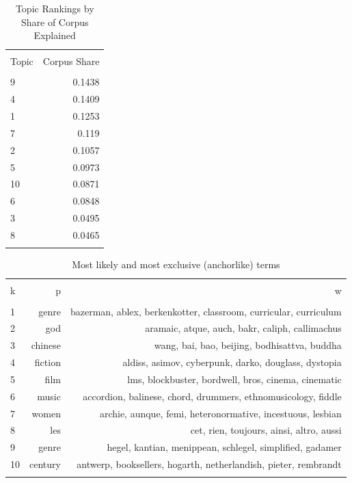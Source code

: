 \documentclass[]{book}
\theoremstyle{definition}
\theoremstyle{definition}
\theoremstyle{definition}
\theoremstyle{remark}
\begin{document}
\begin{table}[!htbp] \centering 
  \caption{Topic Rankings by Share of Corpus Explained} 
  \label{tab:topshare} 
\begin{tabular}{@{\extracolsep{5pt}} lr} 
\\[-1.8ex]\hline 
\hline \\[-1.8ex] 
Topic & Corpus Share \\ 
\hline \\[-1.8ex] 
9 & 0.1438 \\ 
4 & 0.1409 \\ 
1 & 0.1253 \\ 
7 & 0.119 \\ 
2 & 0.1057 \\ 
5 & 0.0973 \\ 
10 & 0.0871 \\ 
6 & 0.0848 \\ 
3 & 0.0495 \\ 
8 & 0.0465 \\ 
\hline \\[-1.8ex] 
\end{tabular} 
\end{table}

\begin{table}[!htbp] \centering 
  \caption{Most likely and most exclusive (anchorlike) terms} 
  \label{tab:prob-anc} 
\begin{tabular}{@{\extracolsep{5pt}} lrr} 
\\[-1.8ex]\hline 
\hline \\[-1.8ex] 
k & p & w \\ 
\hline \\[-1.8ex] 
1 & genre & bazerman, ablex, berkenkotter, classroom, curricular, curriculum \\ 
2 & god & aramaic, atque, auch, bakr, caliph, callimachus \\ 
3 & chinese & wang, bai, bao, beijing, bodhisattva, buddha \\ 
4 & fiction & aldiss, asimov, cyberpunk, darko, douglass, dystopia \\ 
5 & film & lms, blockbuster, bordwell, bros, cinema, cinematic \\ 
6 & music & accordion, balinese, chord, drummers, ethnomusicology, fiddle \\ 
7 & women & archie, aunque, femi, heteronormative, incestuous, lesbian \\ 
8 & les & cet, rien, toujours, ainsi, altro, aussi \\ 
9 & genre & hegel, kantian, menippean, schlegel, simplified, gadamer \\ 
10 & century & antwerp, booksellers, hogarth, netherlandish, pieter, rembrandt \\ 
\hline \\[-1.8ex] 
\end{tabular} 
\end{table}
\end{document}
